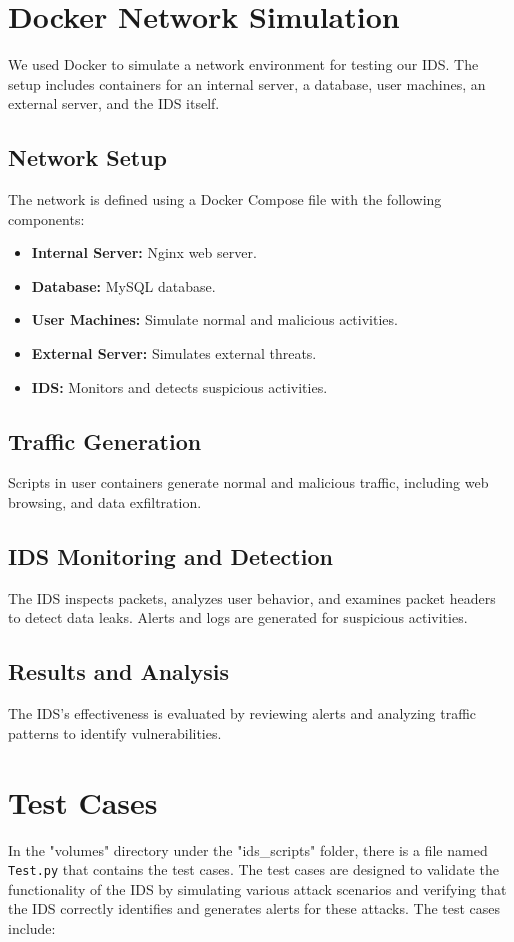 \documentclass{article}
\begin{document}

\section{Docker Network Simulation}
We used Docker to simulate a network environment for testing our IDS. The setup includes containers for an internal server, a database, user machines, an external server, and the IDS itself.

\subsection{Network Setup}
The network is defined using a Docker Compose file with the following components:
\begin{itemize}
    \item \textbf{Internal Server:} Nginx web server.
    \item \textbf{Database:} MySQL database.
    \item \textbf{User Machines:} Simulate normal and malicious activities.
    \item \textbf{External Server:} Simulates external threats.
    \item \textbf{IDS:} Monitors and detects suspicious activities.
\end{itemize}

\subsection{Traffic Generation}
Scripts in user containers generate normal and malicious traffic, including web browsing, and data exfiltration.

\subsection{IDS Monitoring and Detection}
The IDS inspects packets, analyzes user behavior, and examines packet headers to detect data leaks. Alerts and logs are generated for suspicious activities.

\subsection{Results and Analysis}
The IDS's effectiveness is evaluated by reviewing alerts and analyzing traffic patterns to identify vulnerabilities.
\section{Test Cases}
In the "volumes" directory under the "ids\_scripts" folder, there is a file named \texttt{Test.py} that contains the test cases. The test cases are designed to validate the functionality of the IDS by simulating various attack scenarios and verifying that the IDS correctly identifies and generates alerts for these attacks. The test cases include:
\end{document}
